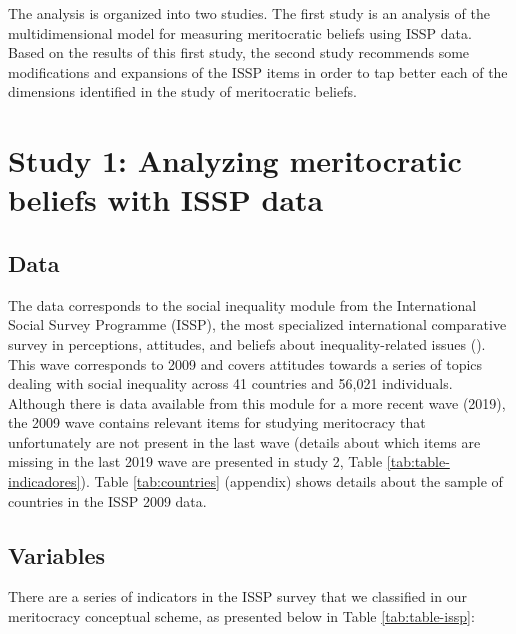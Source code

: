 \documentclass[
  10pt,
  a4paper,
]{article}
\begin{document}
The analysis is organized into two studies. The first study is an analysis of the multidimensional model for measuring meritocratic beliefs using ISSP data. Based on the results of this first study, the second study recommends some modifications and expansions of the ISSP items in order to tap better each of the dimensions identified in the study of meritocratic beliefs.

\section{Study 1: Analyzing meritocratic beliefs with ISSP data}\label{study-1-analyzing-meritocratic-beliefs-with-issp-data}

\subsection{Data}\label{data}

The data corresponds to the social inequality module from the International Social Survey Programme (ISSP), the most specialized international comparative survey in perceptions, attitudes, and beliefs about inequality-related issues (). This wave corresponds to 2009 and covers attitudes towards a series of topics dealing with social inequality across 41 countries and 56,021 individuals. Although there is data available from this module for a more recent wave (2019), the 2009 wave contains relevant items for studying meritocracy that unfortunately are not present in the last wave (details about which items are missing in the last 2019 wave are presented in study 2, Table \ref{tab:table-indicadores}). Table \ref{tab:countries} (appendix) shows details about the sample of countries in the ISSP 2009 data.

\subsection{Variables}\label{variables}

There are a series of indicators in the ISSP survey that we classified in our meritocracy conceptual scheme, as presented below in Table \ref{tab:table-issp}:
\end{document}
